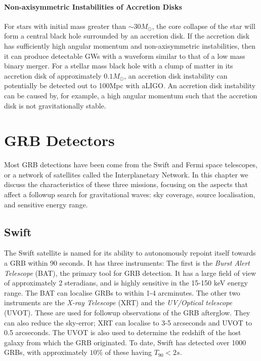\documentclass[11pt]{cuthesis}
\begin{document}
\paragraph{Non-axisymmetric Instabilities of Accretion Disks}
For stars with initial mass greater than $\sim 30M_\odot$, the core collapse of the star will form a central black hole surrounded by an accretion disk. If the accretion disk has sufficiently high angular momentum and non-axisymmetric instabilities, then it can produce detectable GWs with a waveform similar to that of a low mass binary merger\cite{vanputten2,vanputten1}. For a stellar mass black hole with a clump of matter in its accretion disk of approximately $0.1M_\odot$, an accretion disk instability can potentially be detected out to 100Mpc with aLIGO\cite{gw_grb_paradigm,piro_pfahl}. An accretion disk instability can be caused by, for example, a high angular momentum such that the accretion disk is not gravitationally stable. 

\section{GRB Detectors} \label{sec:grb detectors}
Most GRB detections have been come from the Swift and Fermi space telescopes, or a network of satellites called the Interplanetary Network. In this chapter we discuss the characteristics of these three missions, focusing on the aspects that affect a followup search for gravitational waves: sky coverage, source localisation, and sensitive energy range. 

\subsection{Swift}
The Swift satellite is named for its ability to autonomously repoint itself towards a GRB within 90 seconds. It has three instruments: The first is the \textit{Burst Alert Telescope} (BAT), the primary tool for GRB detection. It has a large field of view of approximately 2 steradians, and is highly sensitive in the 15-150 keV energy range. The BAT can localise GRBs to within 1-4 arcminutes. The other two instruments are the \textit{X-ray Telescope} (XRT) and the \textit{UV/Optical telescope} (UVOT). These are used for followup observations of the GRB afterglow. They can also reduce the sky-error; XRT can localise to 3-5 arcseconds and UVOT to 0.5 arcseconds\cite{swift}. The UVOT is also used to determine the redshift of the host galaxy from which the GRB originated. To date, Swift has detected over 1000 GRBs, with approximately $10\%$ of these having $T_{90}<2s$.\cite{swift2}
\end{document}
